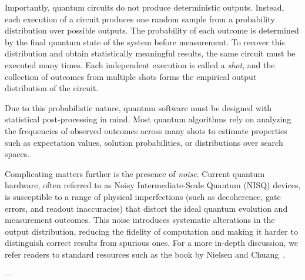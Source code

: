 Importantly, quantum circuits do not produce deterministic outputs. Instead, each execution of a circuit produces one random sample from a probability distribution over possible outputs. The probability of each outcome is determined by the final quantum state of the system before measurement. To recover this distribution and obtain statistically meaningful results, the same circuit must be executed many times. Each independent execution is called a \emph{shot}, and the collection of outcomes from multiple shots forms the empirical output distribution of the circuit.
 
Due to this probabilistic nature, quantum software must be designed with statistical post-processing in mind. Most quantum algorithms rely on analyzing the frequencies of observed outcomes across many shots to estimate properties such as expectation values, solution probabilities, or distributions over search spaces.
 
Complicating matters further is the presence of \emph{noise}. Current quantum hardware, often referred to as Noisy Intermediate-Scale Quantum (NISQ) devices, is susceptible to a range of physical imperfections (such as decoherence, gate errors, and readout inaccuracies) that distort the ideal quantum evolution and measurement outcomes. This noise introduces systematic alterations in the output distribution, reducing the fidelity of computation and making it harder to distinguish correct results from spurious ones. For a more in-depth discussion, we refer readers to standard resources such as the book by Nielsen and Chuang~\cite{nielsen2010quantum}.

---